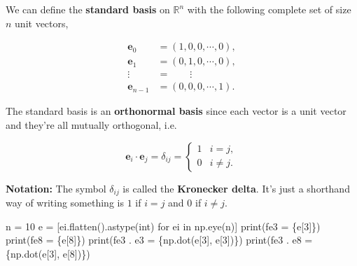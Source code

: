 \documentclass[
  letterpaper,
  DIV=11,
  numbers=noendperiod]{scrreprt}
\newenvironment{Shaded}{\begin{snugshade}}{\end{snugshade}}
\newcommand{\BuiltInTok}[1]{\textcolor[rgb]{0.00,0.23,0.31}{#1}}
\newcommand{\ControlFlowTok}[1]{\textcolor[rgb]{0.00,0.23,0.31}{#1}}
\newcommand{\DecValTok}[1]{\textcolor[rgb]{0.68,0.00,0.00}{#1}}
\newcommand{\KeywordTok}[1]{\textcolor[rgb]{0.00,0.23,0.31}{#1}}
\newcommand{\NormalTok}[1]{\textcolor[rgb]{0.00,0.23,0.31}{#1}}
\newcommand{\OperatorTok}[1]{\textcolor[rgb]{0.37,0.37,0.37}{#1}}
\newcommand{\SpecialCharTok}[1]{\textcolor[rgb]{0.37,0.37,0.37}{#1}}
\newcommand{\SpecialStringTok}[1]{\textcolor[rgb]{0.13,0.47,0.30}{#1}}
\begin{document}
We can define the \textbf{standard basis} on \(\mathbb{R}^n\) with the
following complete set of size \(n\) unit vectors,

\begin{align*}
\mathbf{e}_0 &= (1, 0, 0, \cdots, 0), \\
\mathbf{e}_1 &= (0, 1, 0, \cdots, 0), \\
\vdots \ &= \qquad \vdots \\
\mathbf{e}_{n-1} &= (0, 0, 0, \cdots, 1).
\end{align*}

The standard basis is an \textbf{orthonormal basis} since each vector is
a unit vector and they're all mutually orthogonal, i.e.

\[
\mathbf{e}_i \cdot \mathbf{e}_j = \delta_{ij} = 
\begin{cases}
1 & i = j, \\
0 & i \neq j.
\end{cases}
\]

\textbf{Notation:} The symbol \(\delta_{ij}\) is called the
\textbf{Kronecker delta}. It's just a shorthand way of writing something
is \(1\) if \(i=j\) and \(0\) if \(i \neq j\).

\begin{Shaded}
\begin{Highlighting}[]
\NormalTok{n }\OperatorTok{=} \DecValTok{10}
\NormalTok{e }\OperatorTok{=}\NormalTok{ [ei.flatten().astype(}\BuiltInTok{int}\NormalTok{) }\ControlFlowTok{for}\NormalTok{ ei }\KeywordTok{in}\NormalTok{ np.eye(n)]}
\BuiltInTok{print}\NormalTok{(}\SpecialStringTok{f\textquotesingle{}e3 = }\SpecialCharTok{\{}\NormalTok{e[}\DecValTok{3}\NormalTok{]}\SpecialCharTok{\}}\SpecialStringTok{\textquotesingle{}}\NormalTok{)}
\BuiltInTok{print}\NormalTok{(}\SpecialStringTok{f\textquotesingle{}e8 = }\SpecialCharTok{\{}\NormalTok{e[}\DecValTok{8}\NormalTok{]}\SpecialCharTok{\}}\SpecialStringTok{\textquotesingle{}}\NormalTok{)}
\BuiltInTok{print}\NormalTok{(}\SpecialStringTok{f\textquotesingle{}e3 . e3 = }\SpecialCharTok{\{}\NormalTok{np}\SpecialCharTok{.}\NormalTok{dot(e[}\DecValTok{3}\NormalTok{], e[}\DecValTok{3}\NormalTok{])}\SpecialCharTok{\}}\SpecialStringTok{\textquotesingle{}}\NormalTok{)}
\BuiltInTok{print}\NormalTok{(}\SpecialStringTok{f\textquotesingle{}e3 . e8 = }\SpecialCharTok{\{}\NormalTok{np}\SpecialCharTok{.}\NormalTok{dot(e[}\DecValTok{3}\NormalTok{], e[}\DecValTok{8}\NormalTok{])}\SpecialCharTok{\}}\SpecialStringTok{\textquotesingle{}}\NormalTok{)}
\end{Highlighting}
\end{Shaded}
\end{document}
